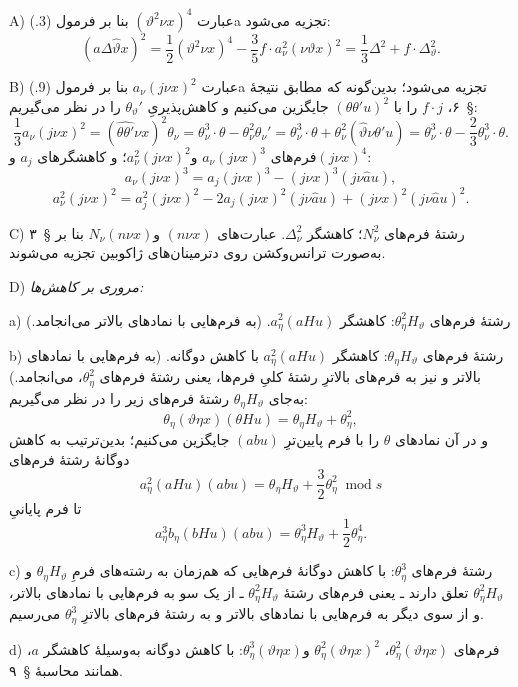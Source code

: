 \documentclass[11pt]{article}
\providecommand{\A}{\Delta}
\providecommand{\modu}[1]{\;\operatorname{mod} #1}
\begin{document}
\noindent A) عبارت $(\vartheta^2\nu x)^4$ بنا بر فرمول (3.)a تجزیه می‌شود:
\[
(a\A\widehat{\vartheta}x)^2=\frac12(\vartheta^2\nu x)^4-\frac35 f\cdot a_\nu^2(\nu\vartheta x)^2
=\frac13\A^2+f\cdot\A_\vartheta^2.
\]

\noindent B) عبارت $a_\nu(j\nu x)^2$ بنا بر فرمول (9.)a تجزیه می‌شود؛ بدین‌گونه که مطابق نتیجهٔ \S\ ۶، $f\cdot j$ را با $(\theta\theta'u)^2$ جایگزین می‌کنیم و کاهش‌پذیریِ $\theta_\vartheta'$ را در نظر می‌گیریم:
\[
\frac13a_\nu(j\nu x)^2=(\widehat{\theta\theta'}\nu x)^2\theta_\nu
=\theta_\nu^3\cdot\theta-\theta_\nu^2\theta_\nu'
=\theta_\nu^3\cdot\theta+\theta_\nu^2(\widehat{\vartheta}\nu\theta'u)
=\theta_\nu^3\cdot\theta-\frac23\theta_\nu^3\cdot\theta.
\]
فرم‌های $a_\nu(j\nu x)^3$ و$a_\nu^2(j\nu x)^2$؛ و کاهشگرهای $a_j$ و$(j\nu x)^4$:
\[
a_\nu(j\nu x)^3=a_j(j\nu x)^3-(j\nu x)^3(j\nu\widehat{a}u),
\]
\[
a_\nu^2(j\nu x)^2=a_j^2(j\nu x)^2-2a_j(j\nu x)^2(j\nu\widehat{a}u)+(j\nu x)^2(j\nu\widehat{a}u)^2.
\]

\noindent C) رشتهٔ فرم‌های $N_\nu^2$؛ کاهشگر $\A_\nu^2$.
عبارت‌های $(n\nu x)$ و$N_\nu(n\nu x)$ بنا بر \S\ ۳ به‌صورت ترانس‌وکشن روی دترمینان‌های ژاکوبین تجزیه می‌شوند.

\noindent D) \emph{مروری بر کاهش‌ها:}

a) رشتهٔ فرم‌های $\theta_\eta^2H_\vartheta$: کاهشگر $a_\eta^2(aHu)$. (به فرم‌هایی با نمادهای بالاتر می‌انجامد.)

b) رشتهٔ فرم‌های $\theta_\eta H_\vartheta$: کاهشگر $a_\eta^2(aHu)$ با کاهش دوگانه.
(به فرم‌هایی با نمادهای بالاتر و نیز به فرم‌های بالاترِ رشتهٔ کلیِ فرم‌ها، یعنی رشتهٔ فرم‌های $\theta_\eta^2$، می‌انجامد.) به‌جای $\theta_\eta H_\vartheta$ رشتهٔ فرم‌های زیر را در نظر می‌گیریم:
\[
\theta_\eta(\vartheta\eta x)(\theta Hu)=\theta_\eta H_\vartheta+\theta_\eta^2,
\]
و در آن نمادهای $\theta$ را با فرم پایین‌ترِ $(abu)$ جایگزین می‌کنیم؛ بدین‌ترتیب به کاهش دوگانهٔ رشتهٔ فرم‌های
\[
a_\eta^2(aHu)(abu)=\theta_\eta H_\vartheta+\frac32\theta_\eta^2\modu{s}
\]
تا فرم پایانیِ
\[
a_\eta^3b_\eta(bHu)(abu)=\theta_\eta^3H_\vartheta+\frac12\theta_\eta^4.
\]

c) رشتهٔ فرم‌های $\theta_\eta^3$: با کاهش دوگانهٔ فرم‌هایی که هم‌زمان به رشته‌های فرمِ $\theta_\eta H_\vartheta$ و$\theta_\eta^2H_\vartheta$ تعلق دارند ـ یعنی فرم‌های رشتهٔ $\theta_\eta^2H_\vartheta$ ـ از یک سو به فرم‌هایی با نمادهای بالاتر، و از سوی دیگر به فرم‌هایی با نمادهای بالاتر و به رشتهٔ فرم‌های بالاترِ $\theta_\eta^3$ می‌رسیم.

d) فرم‌های $\theta_\eta^2(\vartheta\eta x)$، $\theta_\eta^2(\vartheta\eta x)^2$ و$\theta_\eta^3(\vartheta\eta x)$: با کاهش دوگانه به‌وسیلهٔ کاهشگر $a$، همانند محاسبهٔ \S\ ۹.
\end{document}
